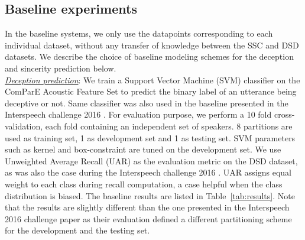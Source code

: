 \documentclass{article}
\begin{document}
\subsection{Baseline experiments}

In the baseline systems, we only use the datapoints corresponding to each individual dataset, without any transfer of knowledge between the SSC and DSD datasets.
We describe the choice of baseline modeling schemes for the deception and sincerity prediction below.
\\

\noindent\underline{\it Deception prediction}: 
We train a Support Vector Machine (SVM) classifier on the ComParE Acoustic Feature Set \cite{weninger2013acoustics} to predict the binary label of an utterance being deceptive or not.
Same classifier was also used in the baseline presented in the Interspeech challenge 2016 \cite{schuller2016interspeech}.
For evaluation purpose, we perform a 10 fold cross-validation, each fold containing an independent set of speakers.  
8 partitions are used as training set, 1 as development set and 1 as testing set.
SVM parameters such as kernel and box-constraint are tuned on the development set.
We use Unweighted Average Recall (UAR) as the evaluation metric on the DSD dataset, as was also the case during the Interspeech challenge 2016 \cite{schuller2016interspeech}.
UAR assigns equal weight to each class during recall computation, a case helpful when the class distribution is biased. 
The baseline results are listed in Table~\ref{tab:results}.
Note that the results are slightly different than the one presented in the Interspeech 2016 challenge paper \cite{schuller2016interspeech} as their evaluation defined a different partitioning scheme for the development and the testing set.
\\
\end{document}
